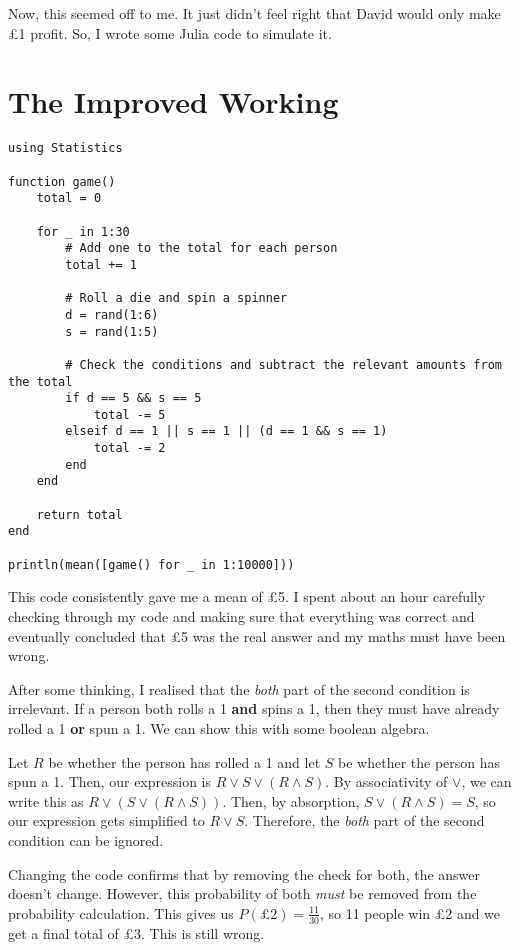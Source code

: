 \documentclass[a4paper]{article}
\begin{document}
Now, this seemed off to me. It just didn't feel right that David would only make £1 profit. So, I wrote some Julia code to simulate it.

\newpage

\section{The Improved Working}

\begin{verbatim}
using Statistics

function game()
	total = 0

	for _ in 1:30
		# Add one to the total for each person
		total += 1

		# Roll a die and spin a spinner
		d = rand(1:6)
		s = rand(1:5)

		# Check the conditions and subtract the relevant amounts from the total
		if d == 5 && s == 5
			total -= 5
		elseif d == 1 || s == 1 || (d == 1 && s == 1)
			total -= 2
		end
	end

	return total
end

println(mean([game() for _ in 1:10000]))
\end{verbatim}

This code consistently gave me a mean of £5. I spent about an hour carefully checking through my code and making sure that everything was correct and eventually concluded that £5 was the real answer and my maths must have been wrong.

After some thinking, I realised that the \textit{both} part of the second condition is irrelevant. If a person both rolls a 1 \textbf{and} spins a 1, then they must have already rolled a 1 \textbf{or} spun a 1. We can show this with some boolean algebra.

Let $R$ be whether the person has rolled a 1 and let $S$ be whether the person has spun a 1. Then, our expression is $R \vee S \vee (R \wedge S)$. By associativity of $\vee$, we can write this as $R \vee (S \vee (R \wedge S))$. Then, by absorption, $S \vee (R \wedge S) = S$, so our expression gets simplified to $R \vee S$. Therefore, the \textit{both} part of the second condition can be ignored.

Changing the code confirms that by removing the check for both, the answer doesn't change. However, this probability of both \textit{must} be removed from the probability calculation. This gives us $P(\text{£}2) = \frac{11}{30}$, so 11 people win £2 and we get a final total of £3. This is still wrong.
\end{document}
